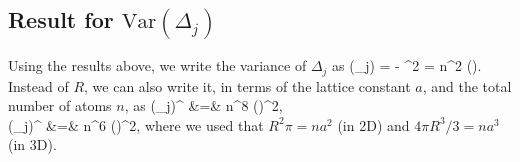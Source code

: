 \subsection{Result for $\mathrm{Var}(\Delta_{j})$}
Using the results above, we write the variance of $\Delta_j$ as
\bel
	(\Delta_j) =  - ^2 = n^2
	\left(\right)\left[I_2 -
	(I_1)^2\right].
\eel 
Instead of $R$, we can also write it, in terms of the lattice constant
$a$, and the total number of atoms $n$, as
\bal
\label{eq:varDelta_j_2D}
	(\Delta_j)^ &=&  n^8
	\left(\right)^2,
	\\
\label{eq:varDelta_j_3D}
	(\Delta_j)^ &=&  n^6
	\left(\right)^2,
\eal
where we used that $R^2 \pi = n a^2$ (in 2D) and $4\pi R^3/3 = na^3$ (in 3D).

